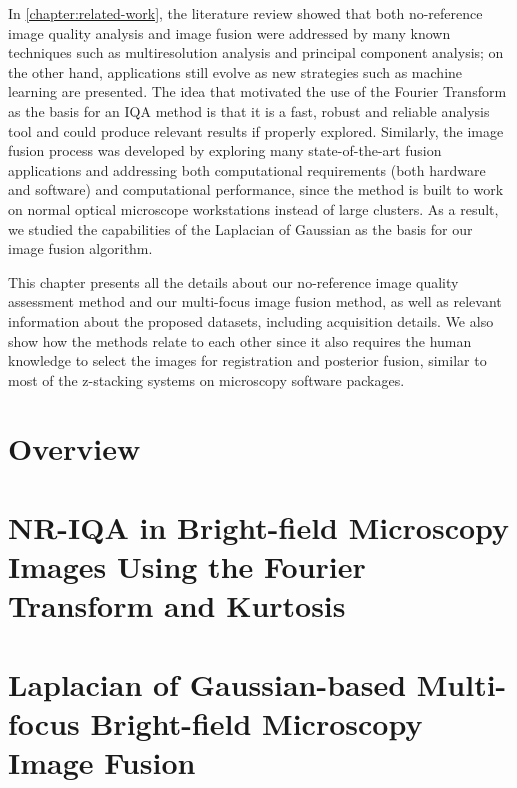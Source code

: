 In \autoref{chapter:related-work}, the literature review showed that both no-reference image quality analysis and image fusion were addressed by many known techniques such as multiresolution analysis and principal component analysis; on the other hand, applications still evolve as new strategies such as machine learning are presented. The idea that motivated the use of the Fourier Transform as the basis for an IQA method is that it is a fast, robust and reliable analysis tool and could produce relevant results if properly explored. Similarly, the image fusion process was developed by exploring many state-of-the-art fusion applications and addressing both computational requirements (both hardware and software) and computational performance, since the method is built to work on normal optical microscope workstations instead of large clusters. As a result, we studied the capabilities of the Laplacian of Gaussian as the basis for our image fusion algorithm. 

This chapter presents all the details about our no-reference image quality assessment method and our multi-focus image fusion method, as well as relevant information about the proposed datasets, including acquisition details. We also show how the methods relate to each other since it also requires the human knowledge to select the images for registration and posterior fusion, similar to most of the z-stacking systems on microscopy software packages.

\section{Overview}




\section{NR-IQA in Bright-field Microscopy Images Using the Fourier Transform and Kurtosis}


\section{Laplacian of Gaussian-based Multi-focus Bright-field Microscopy Image Fusion}
